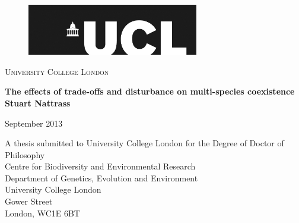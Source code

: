 

\begin{figure}[htbp]
\begin{center}
\includegraphics[width=7.5cm]{ucllogo.pdf}
\end{center}
\end{figure}

\begin{center}
\begin{huge}\textsc{University College London}\end{huge}
\end{center}
\vspace{2cm}
\hline
\vfill
\begin{center}
{ \huge \textbf{The effects of trade-offs and disturbance on multi-species coexistence} }\\[1cm]
\vfill
\vfill
\large\textbf{Stuart Nattrass}
\end{center}

\begin{center}
\vfill
September 2013\\
\end{center}

\vfill
\begin{center}
A thesis submitted to University College London for the Degree of Doctor of Philosophy\\
\vfill
Centre for Biodiversity and Environmental Research\\
Department of Genetics, Evolution and Environment\\
University College London\\
Gower Street\\
London, WC1E 6BT
\end{center}


